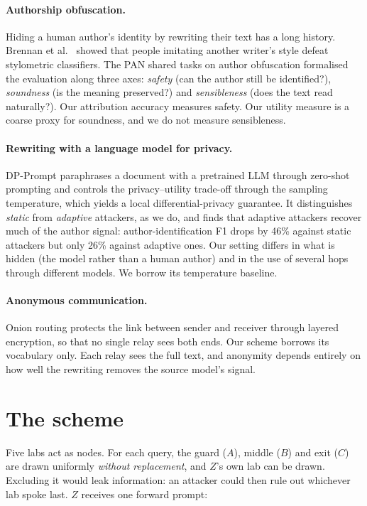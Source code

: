\documentclass[11pt]{article}
\begin{document}
\paragraph{Authorship obfuscation.} Hiding a human author's identity by rewriting their text has a long history. Brennan et al.\ \cite{adversarial-stylometry} showed that people imitating another writer's style defeat stylometric classifiers. The PAN shared tasks on author obfuscation \cite{pan2017,pan2018} formalised the evaluation along three axes: \emph{safety} (can the author still be identified?), \emph{soundness} (is the meaning preserved?) and \emph{sensibleness} (does the text read naturally?). Our attribution accuracy measures safety. Our utility measure is a coarse proxy for soundness, and we do not measure sensibleness.

\paragraph{Rewriting with a language model for privacy.} DP-Prompt \cite{dpprompt} paraphrases a document with a pretrained LLM through zero-shot prompting and controls the privacy--utility trade-off through the sampling temperature, which yields a local differential-privacy guarantee. It distinguishes \emph{static} from \emph{adaptive} attackers, as we do, and finds that adaptive attackers recover much of the author signal: author-identification F1 drops by 46\% against static attackers but only 26\% against adaptive ones. Our setting differs in what is hidden (the model rather than a human author) and in the use of several hops through different models. We borrow its temperature baseline.

\paragraph{Anonymous communication.} Onion routing \cite{tor} protects the link between sender and receiver through layered encryption, so that no single relay sees both ends. Our scheme borrows its vocabulary only. Each relay sees the full text, and anonymity depends entirely on how well the rewriting removes the source model's signal.

\section{The scheme}
\label{sec:scheme}

Five labs act as nodes. For each query, the guard ($A$), middle ($B$) and exit ($C$) are drawn uniformly \emph{without replacement}, and $Z$'s own lab can be drawn. Excluding it would leak information: an attacker could then rule out whichever lab spoke last. $Z$ receives one forward prompt:
\end{document}
